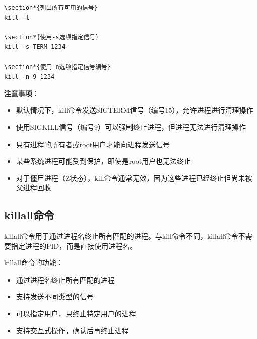 \documentclass[12pt,UTF8]{ctexbook}
\begin{document}
\begin{verbatim}
\section*{列出所有可用的信号}
kill -l

\section*{使用-s选项指定信号}
kill -s TERM 1234

\section*{使用-n选项指定信号编号}
kill -n 9 1234
\end{verbatim}

\textbf{注意事项}：
\begin{itemize}
    \item 默认情况下，kill命令发送SIGTERM信号（编号15），允许进程进行清理操作
    \item 使用SIGKILL信号（编号9）可以强制终止进程，但进程无法进行清理操作
    \item 只有进程的所有者或root用户才能向进程发送信号
    \item 某些系统进程可能受到保护，即使是root用户也无法终止
    \item 对于僵尸进程（Z状态），kill命令通常无效，因为这些进程已经终止但尚未被父进程回收
\end{itemize}

\subsection{killall命令}
killall命令用于通过进程名终止所有匹配的进程。与kill命令不同，killall命令不需要指定进程的PID，而是直接使用进程名。

killall命令的功能：
\begin{itemize}
    \item 通过进程名终止所有匹配的进程
    \item 支持发送不同类型的信号
    \item 可以指定用户，只终止特定用户的进程
    \item 支持交互式操作，确认后再终止进程
\end{itemize}
\end{document}
